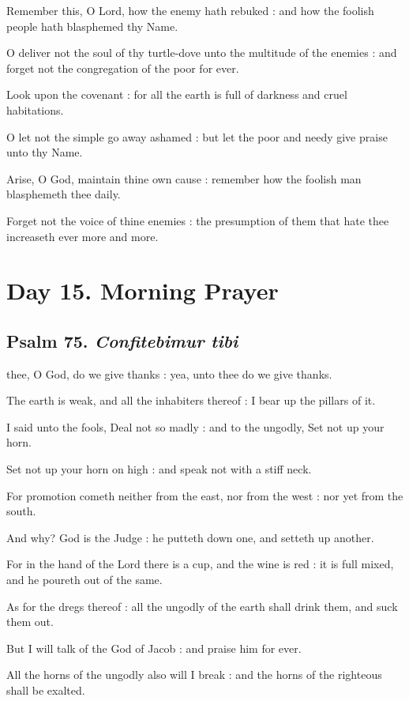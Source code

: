 Remember this, O Lord, how the enemy hath rebuked : and how the foolish people hath blasphemed thy Name.\par
{}O deliver not the soul of thy turtle-dove unto the multitude of the enemies : and forget not the congregation of the poor for ever.\par
{}Look upon the covenant : for all the earth is full of darkness and cruel habitations.\par
{}O let not the simple go away ashamed : but let the poor and needy give praise unto thy Name.\par
{}Arise, O God, maintain thine own cause : remember how the foolish man blasphemeth thee daily.\par
{}Forget not the voice of thine enemies : the presumption of them that hate thee increaseth ever more and more.\par

\section*{Day 15. Morning Prayer}

\subsection{Psalm 75. \textit{Confitebimur tibi}}

 thee, O God, do we give thanks : yea, unto thee do we give thanks.\par
{}
The earth is weak, and all the inhabiters thereof : I bear up the pillars of it.\par
{}I said unto the fools, Deal not so madly : and to the ungodly, Set not up your horn.\par
{}Set not up your horn on high : and speak not with a stiff neck.\par
{}For promotion cometh neither from the east, nor from the west : nor yet from the south.\par
{}And why? God is the Judge : he putteth down one, and setteth up another.\par
{}For in the hand of the Lord there is a cup, and the wine is red : it is full mixed, and he poureth out of the same.\par
{}As for the dregs thereof : all the ungodly of the earth shall drink them, and suck them out.\par
{}But I will talk of the God of Jacob : and praise him for ever.\par
{}All the horns of the ungodly also will I break : and the horns of the righteous shall be exalted.\par


